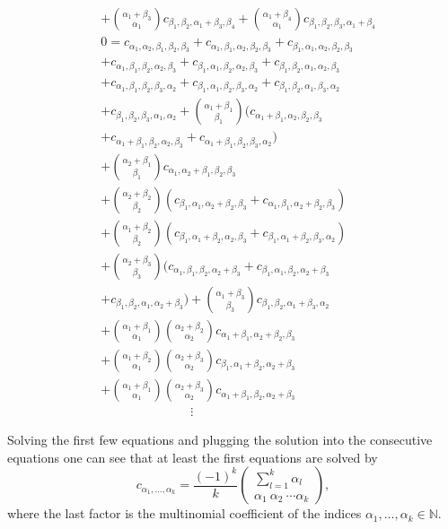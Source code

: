 \documentclass[b5paper,draft,openbib,12pt]{memoir}
\begin{document}
\begin{align*}
&+ \binom{\alpha_1+\beta_3}{\alpha_1} c_{\beta_1,\beta_2,\alpha_1+\beta_3,\beta_4}
+ \binom{\alpha_1+\beta_4}{\alpha_1} c_{\beta_1,\beta_2,\beta_3,\alpha_1+\beta_4}\\
&0= c_{\alpha_1,\alpha_2,\beta_1,\beta_2,\beta_3} 
+c_{\alpha_1,\beta_1,\alpha_2,\beta_2,\beta_3} 
+c_{\beta_1,\alpha_1,\alpha_2,\beta_2,\beta_3} \\
&+c_{\alpha_1,\beta_1,\beta_2,\alpha_2,\beta_3} 
+c_{\beta_1,\alpha_1,\beta_2,\alpha_2,\beta_3} 
+c_{\beta_1,\beta_2,\alpha_1,\alpha_2,\beta_3} \\
&+c_{\alpha_1,\beta_1,\beta_2,\beta_3,\alpha_2} 
+c_{\beta_1,\alpha_1,\beta_2,\beta_3,\alpha_2} 
+c_{\beta_1,\beta_2,\alpha_1,\beta_3,\alpha_2} \\
&+c_{\beta_1,\beta_2,\beta_3,\alpha_1,\alpha_2} 
+\binom{\alpha_1+\beta_1}{\beta_1} (c_{\alpha_1+\beta_1,\alpha_2,\beta_2,\beta_3}\\
&+c_{\alpha_1+\beta_1,\beta_2,\alpha_2,\beta_3}
+c_{\alpha_1+\beta_1,\beta_2,\beta_3,\alpha_2})\\
&+\binom{\alpha_2+\beta_1}{\beta_1} c_{\alpha_1,\alpha_2+\beta_1,\beta_2,\beta_3}\\
&+\binom{\alpha_2+\beta_2}{\beta_2} (c_{\beta_1,\alpha_1,\alpha_2+\beta_2,\beta_3}
+c_{\alpha_1,\beta_1,\alpha_2+\beta_2,\beta_3})\\
&+\binom{\alpha_1+\beta_2}{\beta_2} (c_{\beta_1,\alpha_1+\beta_2,\alpha_2,\beta_3}
+c_{\beta_1,\alpha_1+\beta_2,\beta_3,\alpha_2})\\
&+\binom{\alpha_2+\beta_3}{\beta_3}( c_{\alpha_1,\beta_1,\beta_2,\alpha_2+\beta_3}
+c_{\beta_1,\alpha_1,\beta_2,\alpha_2+\beta_3}\\
&+c_{\beta_1,\beta_2,\alpha_1,\alpha_2+\beta_3})
+\binom{\alpha_1+\beta_3}{\beta_3} c_{\beta_1,\beta_2,\alpha_1+\beta_3,\alpha_2}\\
&+\binom{\alpha_1+\beta_1}{\alpha_1} \binom{\alpha_2+\beta_2}{\alpha_2} 
c_{\alpha_1+\beta_1,\alpha_2+\beta_2,\beta_3}\\
&+\binom{\alpha_1+\beta_2}{\alpha_1} \binom{\alpha_2+\beta_3}{\alpha_2} 
c_{\beta_1,\alpha_1+\beta_2,\alpha_2+\beta_3}\\
&+\binom{\alpha_1+\beta_1}{\alpha_1} \binom{\alpha_2+\beta_3}{\alpha_2} 
c_{\alpha_1+\beta_1,\beta_2,\alpha_2+\beta_3}\\
& \hspace{3cm} \vdots
\end{align*}

Solving the first few equations and plugging the solution into the consecutive
 equations one can see that at least the first equations are solved by 
\begin{equation}
c_{\alpha_1,\dots, \alpha_k} = \frac{(-1)^k}{k} \begin{pmatrix}\sum_{l=1}^k \alpha_l\\ \alpha_1\ \alpha_2 \ \cdots \alpha_k\end{pmatrix},
\end{equation}
where the last factor is the multinomial coefficient of the indices \(\alpha_1,\dots, \alpha_k\in\mathbb{N}\).
\end{document}
